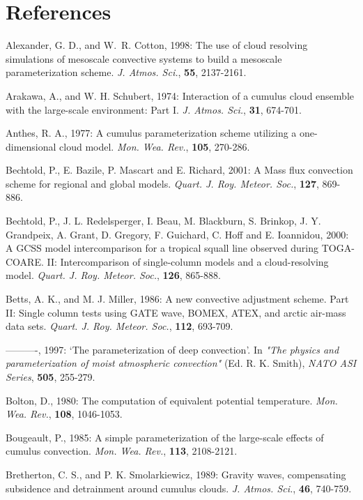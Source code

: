 \section{References}

\noindent
\por
Alexander, G. D., and W.~R. Cotton, 1998:
The use of cloud resolving simulations of mesoscale convective
systems to build a mesoscale parameterization scheme.
{\it J. Atmos. Sci.}, {\bf 55}, 2137-2161.

\por
Arakawa, A., and W. H. Schubert, 1974: Interaction of a cumulus
cloud ensemble with the large-scale environment: Part I.
{\it J. Atmos. Sci.}, {\bf 31}, 674-701.

\por
Anthes, R. A., 1977: A cumulus parameterization scheme utilizing
a one-dimensional cloud model. {\it Mon. Wea. Rev.}, {\bf 105}, 270-286.

\por
Bechtold, P., E. Bazile, P. Mascart and E. Richard, 2001:
A Mass flux convection scheme for regional and global models.
{\it Quart. J. Roy. Meteor. Soc.}, {\bf 127}, 869-886.

\por
Bechtold, P., J. L. Redelsperger, I. Beau, M. Blackburn, S. Brinkop,
J. Y. Grandpeix, A. Grant, D. Gregory, F. Guichard, C. Hoff
and E. Ioannidou, 2000: A GCSS model
intercomparison for a tropical squall line observed during TOGA-COARE.
II: Intercomparison of single-column models and a cloud-resolving model.
{\it Quart. J. Roy. Meteor. Soc.}, {\bf 126}, 865-888.

\por
Betts, A. K., and M. J. Miller, 1986: A new convective adjustment scheme.
Part II: Single column tests using GATE wave, BOMEX, ATEX, and arctic air-mass
data sets. {\it Quart. J. Roy. Meteor. Soc.}, {\bf 112}, 693-709.

\por
----------, 1997:
`The parameterization of deep convection'.
In {\it "The physics and parameterization of moist atmospheric convection"}
(Ed. R. K. Smith), {\it NATO ASI Series}, {\bf 505}, 255-279.

\por
Bolton, D., 1980: The computation of equivalent potential temperature.
{\it Mon. Wea. Rev.}, {\bf 108}, 1046-1053.

\por
Bougeault, P., 1985: A simple parameterization of the large-scale
effects of cumulus convection. {\it Mon. Wea. Rev.}, {\bf 113}, 2108-2121.

\por
Bretherton, C. S., and P. K. Smolarkiewicz, 1989: Gravity waves,
compensating subsidence and detrainment around cumulus clouds.
{\it J. Atmos. Sci.}, {\bf 46}, 740-759.

